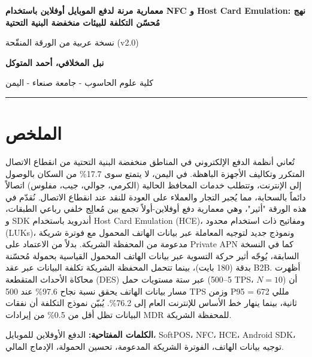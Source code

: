 \documentclass[12pt,a4paper]{article}
\begin{document}
\begin{center}
{\LARGE\bfseries\color{primary} معمارية مرنة لدفع الموبايل أوفلاين باستخدام NFC و Host Card Emulation: نهج مُحسّن التكلفة للبيئات منخفضة البنية التحتية}

\vspace{0.5cm}
{\large نسخة عربية من الورقة المنقّحة (v2.0)}

\vspace{0.8cm}
{\large\bfseries نبل المخلافي، أحمد المتوكل}

\vspace{0.2cm}
{\normalsize كلية علوم الحاسوب - جامعة صنعاء - اليمن}
\end{center}

\vspace{0.5cm}
\hrule
\vspace{0.5cm}

\section*{الملخص}
تُعاني أنظمة الدفع الإلكتروني في المناطق منخفضة البنية التحتية من انقطاع الاتصال المتكرر وتكاليف الأجهزة الباهظة. في اليمن، لا يتمتع سوى 17.7\% من السكان بالوصول إلى الإنترنت، وتتطلب خدمات المحافظ الحالية (الكرمي، جوالي، جيب، مفلوس) اتصالاً دائماً بالسحابة، مما يُجبر التجار والعملاء على العودة للنقد عند انقطاع الاتصال. نُقدّم في هذه الورقة "أثير"، وهي معمارية دفع أوفلاين-أولاً تجمع بين مُعالِج خلفي رباعي الطبقات، و SDK أندرويد باستخدام Host Card Emulation (HCE)، ومفاتيح ذات استخدام محدود (LUKs)، ونموذج جديد لتوجيه المعاملة عبر بيانات الهاتف المحمول مع فوترة شريكة مدعومة من المحفظة الشريكة. بدلاً من الاعتماد على Private APN كما في النسخة السابقة، يُوجّه أثير حركة التسوية عبر بيانات الهاتف المحمول القياسية بحمولة مُحسّنة بدقة (180 بايت)، بينما تتحمل المحفظة الشريكة تكلفة البيانات عبر عقد B2B. أظهرت محاكاة الأحداث المتقطعة (DES) عبر ستة مستويات حمل (5--500 TPS، $N=10$) أن مسار بيانات الهاتف يحقق نسبة نجاح 97.6\% عند 500 TPS وزمن P95 = 672 مللي ثانية، بينما ينهار خط الأساس للإنترنت العام إلى 76.2\%. يُبيّن نموذج التكلفة أن نفقات البيانات تظل أقل من 0.5\% من إيرادات MDR للمحفظة الشريكة.

\vspace{0.3cm}
\noindent\textbf{الكلمات المفتاحية:} الدفع الأوفلاين للموبايل، SoftPOS، NFC، HCE، Android SDK، توجيه بيانات الهاتف، الفوترة الشريكة المدعومة، تحسين الحمولة، الإدماج المالي.
\end{document}

